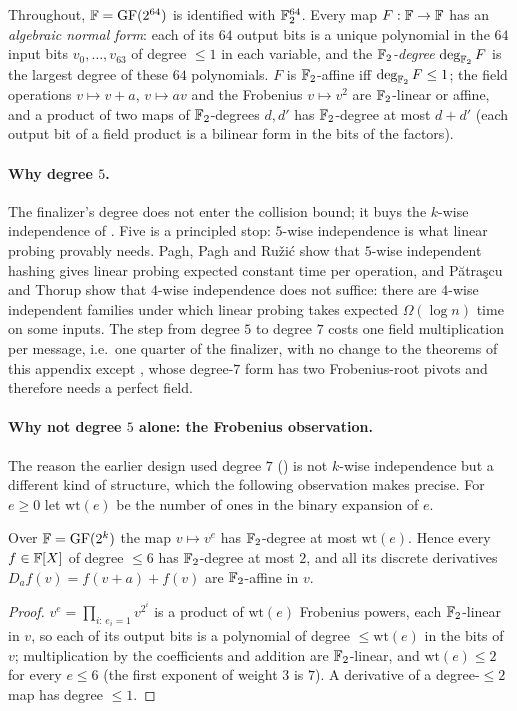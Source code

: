 Throughout, $\mathbb{F}=\mathrm{GF}(2^{64})$ is identified with $\mathbb{F}_2^{64}$.  Every
map $F:\mathbb{F}\to\mathbb{F}$ has an \emph{algebraic normal form}: each of its $64$ output
bits is a unique polynomial in the $64$ input bits $v_0,\dots,v_{63}$ of
degree $\le1$ in each variable, and the \emph{$\mathbb{F}_2$-degree} $\deg_{\mathbb{F}_2}F$ is
the largest degree of these $64$ polynomials.  $F$ is $\mathbb{F}_2$-affine iff
$\deg_{\mathbb{F}_2}F\le1$; the field operations $v\mapsto v+a$, $v\mapsto av$ and the
Frobenius $v\mapsto v^2$ are $\mathbb{F}_2$-linear or affine, and a product of two
maps of $\mathbb{F}_2$-degrees $d,d'$ has $\mathbb{F}_2$-degree at most $d+d'$ (each output bit
of a field product is a bilinear form in the bits of the factors).

\paragraph{Why degree $5$.}
The finalizer's degree does not enter the collision bound; it buys the
$k$-wise independence of .  Five is a principled stop:
$5$-wise independence is what linear probing provably needs.  Pagh, Pagh and
Ru\v{z}i\'c \cite{pagh2009linear} show that $5$-wise independent hashing
gives linear probing expected constant time per operation, and
P\u{a}tra\c{s}cu and Thorup \cite{patracscu2016kindependence} show that
$4$-wise independence does not suffice: there are $4$-wise independent
families under which linear probing takes expected $\Omega(\log n)$ time on
some inputs.  The step from degree $5$ to degree $7$ costs one field
multiplication per message, i.e.\ one quarter of the finalizer, with no
change to the theorems of this appendix except , whose degree-$7$ form has two Frobenius-root pivots and therefore needs a perfect field.

\paragraph{Why not degree $5$ alone: the Frobenius observation.}
The reason the earlier design used degree $7$ () is
not $k$-wise independence but a different kind of structure, which the
following observation makes precise.  For $e\ge0$ let $\mathrm{wt}(e)$ be the
number of ones in the binary expansion of $e$.

\begin{lemma}\label{lem:ph:popcount}
Over $\mathbb{F}=\mathrm{GF}(2^k)$ the map $v\mapsto v^e$ has $\mathbb{F}_2$-degree at most
$\mathrm{wt}(e)$.  Hence every $f\in\mathbb{F}[X]$ of degree $\le6$ has $\mathbb{F}_2$-degree at most
$2$, and all its discrete derivatives $D_af(v)=f(v+a)+f(v)$ are $\mathbb{F}_2$-affine
in $v$.
\end{lemma}
\begin{proof}
$v^e=\prod_{i:\,e_i=1}v^{2^i}$ is a product of $\mathrm{wt}(e)$ Frobenius powers,
each $\mathbb{F}_2$-linear in $v$, so each of its output bits is a polynomial of
degree $\le\mathrm{wt}(e)$ in the bits of $v$; multiplication by the coefficients
and addition are $\mathbb{F}_2$-linear, and $\mathrm{wt}(e)\le2$ for every $e\le6$ (the first
exponent of weight $3$ is $7$).  A derivative of a degree-$\le2$ map has
degree $\le1$.
\end{proof}

